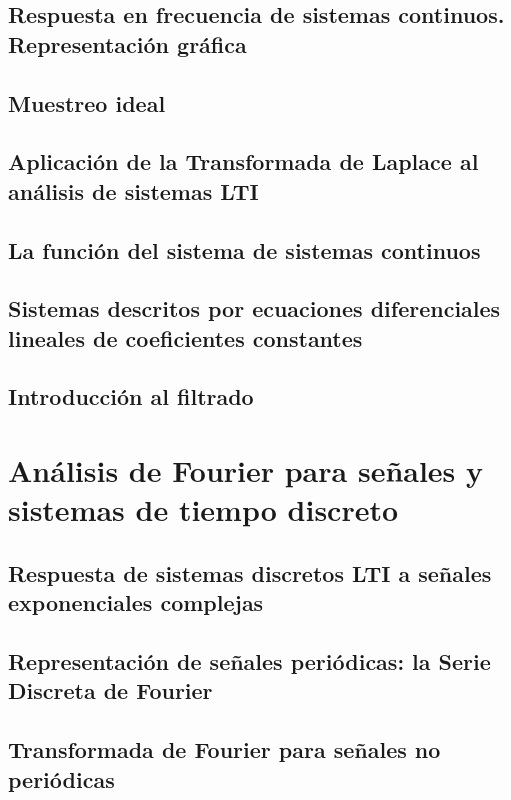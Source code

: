 \documentclass[a4paper]{book}
\begin{document}
\section{Respuesta en frecuencia de sistemas continuos. Representación gráfica}

\section{Muestreo ideal}

\section{Aplicación de la Transformada de Laplace al análisis de sistemas LTI}

\section{La función del sistema de sistemas continuos}

\section{Sistemas descritos por ecuaciones diferenciales lineales de coeficientes constantes}

\section{Introducción al filtrado}


\chapter{Análisis de Fourier para señales y sistemas de tiempo discreto}

\section{Respuesta de sistemas discretos LTI a señales exponenciales complejas}

\section{Representación de señales periódicas: la Serie Discreta de Fourier}

\section{Transformada de Fourier para señales no periódicas}
\end{document}
